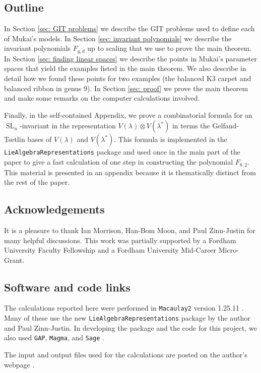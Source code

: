 \documentclass{amsart}[12pt]
\theoremstyle{definition}
\numberwithin{equation}{section}
\newcommand{\SL}{\operatorname{SL}}
\begin{document}
  
\subsection*{Outline}
In Section \ref{sec: GIT problems} we describe the GIT problems used
to define each of Mukai's models. In Section \ref{sec: invariant
  polynomials} we describe the invariant polynomials $F_{g,d}$ up to
scaling that we use to prove the main theorem.  In Section \ref{sec:
  finding linear spaces} we describe the points in Mukai's parameter
spaces that yield the examples listed in the main theorem. We also
describe in detail how we found these points for two examples (the
balanced K3 carpet and balanced ribbon in genus 9). In Section
\ref{sec: proof} we prove the main theorem and make some remarks on the computer
calculations involved.

Finally, in the self-contained Appendix, we
prove a combinatorial formula for an $\SL_n$-invariant in the
representation $V(\lambda)\otimes V(\lambda^{*})$ in terms the
Gelfand-Tsetlin bases of $V(\lambda)$ and $V(\lambda^{*})$. This formula is
implemented in the \texttt{LieAlgebraRepresentations} package and used once in the main part of the paper to give a fast
calculation of one step in constructing the polynomial
$F_{8,2}$. This material is presented in an appendix because it is thematically distinct from the rest of the paper. 



\subsection*{Acknowledgements}
It is a pleasure to thank  Ian
Morrison, Han-Bom Moon, and Paul Zinn-Justin for many helpful discussions. This work was partially supported by a
Fordham University Faculty Fellowship and a Fordham University Mid-Career Micro-Grant.

\subsection*{Software and code links}
The calculations reported here were performed in
\texttt{Macaulay2} version 1.25.11 \cite{M2}. Many of these use the new
\texttt{LieAlgebraRepresentations} package by the author and Paul Zinn-Justin. In developing the package and the code for this project, we also used 
\texttt{GAP}, \texttt{Magma}, and \texttt{Sage} \cites{GAP, Magma, Sage}.


The input and output files used for the calculations are posted on
the author's webpage \cite{Code}.
\end{document}
